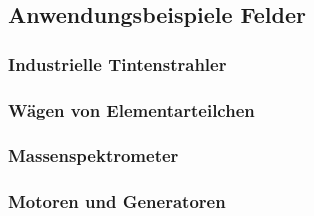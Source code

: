 \subsection{Anwendungsbeispiele Felder}

\subsubsection{Industrielle Tintenstrahler}

\subsubsection{Wägen von Elementarteilchen}

\subsubsection{Massenspektrometer}

\subsubsection{Motoren und Generatoren}

